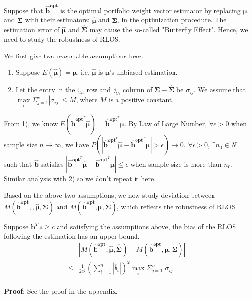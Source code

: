 \documentclass{gapd}
\begin{document}
Suppose that $\mathbf{\hat{b}^{opt}}$ is the optimal portfolio weight vector estimator by replacing $\boldsymbol{\mu}$ and $\boldsymbol{\Sigma}$ with their estimators: $\hat{\boldsymbol{\mu}}$ and $\hat{\boldsymbol{\Sigma}}$, in the optimization procedure. The estimation error of $\hat{\boldsymbol{\mu}}$ and $\hat{\boldsymbol{\Sigma}}$ may cause the so-called "Butterfly Effect". Hence, we need to study the robustness of RLOS. 

We first give two reasonable assumptions here:

\begin{enumerate}[1)]
\item Suppose $E(\hat{\boldsymbol{\mu}})=\boldsymbol{\mu}$, i.e. $\hat{\boldsymbol{\mu}}$ is $\boldsymbol{\mu}$'s unbiased estimation.\\
\item Let the entry in the $i_{th}$ row and $j_{th}$ column of $\boldsymbol{\Sigma}-\hat{\boldsymbol{\Sigma}}$ be $\sigma_{ij}$. We assume that $\max \limits_{i}\Sigma_{j=1}^n|\sigma_{ij}| \le M$, where $M$ is a positive constant.
\end{enumerate}

From 1), we know $E(\mathbf{\hat{b}}^{\mathbf{opt}^{T}}\boldsymbol{\hat{\mu}})=\mathbf{\hat{b}}^{\mathbf{opt}^{T}}\boldsymbol{\mu}$. By Law of Large Number, $\forall \epsilon >0$ when sample size $n\to \infty$, we have $P(|\mathbf{\hat{b}}^{\mathbf{opt}^{T}}\boldsymbol{\hat{\mu}}-\mathbf{\hat{b}}^{\mathbf{opt}^{T}}\boldsymbol{\mu}|> \epsilon)\to 0$. $\forall \epsilon >0$, $\exists n_0 \in N_+$ such that $\mathbf{\hat{b}}$ satisfies $|\mathbf{\hat{b}}^{\mathbf{opt}^{T}}\boldsymbol{\hat{\mu}}-\mathbf{\hat{b}}^{\mathbf{opt}^{T}}\boldsymbol{\mu}| \le \epsilon$ when sample size is more than $n_0$. Similar analysis with 2) so we don't repeat it here.

Based on the above two assumptions, we now study deviation between $M(\mathbf{\hat{b}^{opt}},,\boldsymbol{\hat{\mu}},\boldsymbol{\hat{\Sigma}})$ and $M(\mathbf{\hat{b}^{opt}},\boldsymbol{\mu},\boldsymbol{\Sigma})$,  which reflects the robustness of RLOS.

\begin{theorem}
Suppose $\mathbf{b}^T \boldsymbol{\mu} \ge c$ and satisfying the assumptions above, the bias of the RLOS following the estimation has an upper bound.
\begin{equation}
\begin{aligned}
&|M(\mathbf{\hat{b}^{opt}},\boldsymbol{\hat{\mu}},\boldsymbol{\hat{\Sigma}})-M(\mathbf{\hat{b}^{opt}},\boldsymbol{\mu},\boldsymbol{\Sigma})| \\
\le &\frac{1}{2c^2}(\sum_{i=1}^n|\hat{b}_i|)^2 \max \limits_{i}\Sigma_{j=1}^n|\sigma_{ij}|
\end{aligned}
\end{equation}\\
\textbf{Proof}: See the proof in the appendix.
\end{theorem}
\end{document}
